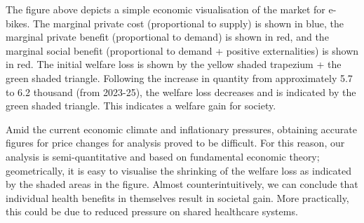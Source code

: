 \begin{center}
\end{center}

The figure above depicts a simple economic visualisation of the market for e-bikes. The marginal private cost (proportional to supply) is shown in blue, the marginal private benefit (proportional to demand) is shown in red, and the marginal social benefit (proportional to demand + positive externalities) is shown in red. The initial welfare loss is shown by the yellow shaded trapezium + the green shaded triangle. Following the increase in quantity from approximately 5.7 to 6.2 thousand (from 2023-25), the welfare loss decreases and is indicated by the green shaded triangle. This indicates a welfare gain for society.

Amid the current economic climate and inflationary pressures, obtaining accurate figures for price changes for analysis proved to be difficult. For this reason, our analysis is semi-quantitative and based on fundamental economic theory; geometrically, it is easy to visualise the shrinking of the welfare loss as indicated by the shaded areas in the figure. 
Almost counterintuitively, we can conclude that individual health benefits in themselves result in societal gain. More practically, this could be due to reduced pressure on shared healthcare systems. 


\newpage

